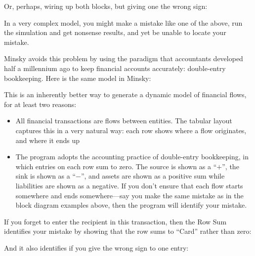 \begin{center}
\end{center}

Or, perhaps, wiring up both blocks, but giving one the wrong sign:

\begin{center}
\end{center}

In a very complex model, you might make a mistake like one of the above, run the simulation and get nonsense results, and yet be unable to locate your mistake.


Minsky avoids this problem by using the paradigm that accountants
developed half a millennium ago to keep financial accounts accurately:
double-entry bookkeeping. Here is the same model in Minsky:

\begin{center}
\end{center}

This is an inherently better way to generate a dynamic model of financial flows, for at least two reasons:
\begin{itemize}
\item All financial transactions are flows between entities. The
  tabular layout captures this in a very natural way: each row shows
  where a flow originates, and where it ends up
\item The program adopts the accounting practice of double-entry
  bookkeeping, in which entries on each row sum to zero. The source is
  shown as a ``$+$'', the sink is shown as a ``$-$'', and assets are shown
  as a positive sum while liabilities are shown as a negative. If you
  don't ensure that each flow starts somewhere and ends
  somewhere---say you make the same mistake as in the block diagram
  examples above, then the program will identify your mistake.
\end{itemize}

If you forget to enter the recipient in this transaction, then the Row
Sum identifies your mistake by showing that the row sums to ``Card''
rather than zero:

\begin{center}
\end{center}

And it also identifies if you give the wrong sign to one entry:

\begin{center}
\end{center}

